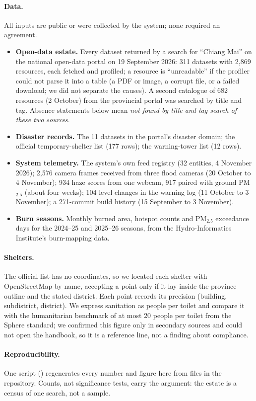 \documentclass[10pt,twocolumn,a4paper]{article}
\newcommand{\kw}[1]{\textbf{#1}}
\begin{document}
\paragraph{Data.} All inputs are public or were collected by the system; none required an agreement.
\begin{itemize}
\item \kw{Open-data estate.} Every dataset returned by a search for ``Chiang Mai'' on the national open-data portal on 19 September 2026: 311 datasets with 2{,}869 resources, each fetched and profiled; a resource is ``unreadable'' if the profiler could not parse it into a table (a PDF or image, a corrupt file, or a failed download; we did not separate the causes). A second catalogue of 682 resources (2 October) from the provincial portal was searched by title and tag. Absence statements below mean \emph{not found by title and tag search of these two sources}.
\item \kw{Disaster records.} The 11 datasets in the portal's disaster domain; the official temporary-shelter list (177 rows); the warning-tower list (12 rows).
\item \kw{System telemetry.} The system's own feed registry (32 entities, 4 November 2026); 2,576 camera frames received from three flood cameras (20 October to 4 November); 934 haze scores from one webcam, 917 paired with ground PM$_{2.5}$ (about four weeks); 104 level changes in the warning log (11 October to 3 November); a 271-commit build history (15 September to 3 November).
\item \kw{Burn seasons.} Monthly burned area, hotspot counts and PM$_{2.5}$ exceedance days for the 2024--25 and 2025--26 seasons, from the Hydro-Informatics Institute's burn-mapping data.
\end{itemize}
\paragraph{Shelters.} The official list has no coordinates, so we located each shelter with OpenStreetMap by name, accepting a point only if it lay inside the province outline and the stated district. Each point records its precision (building, subdistrict, district). We express sanitation as people per toilet and compare it with the humanitarian benchmark of at most 20 people per toilet from the Sphere standard; we confirmed this figure only in secondary sources and could not open the handbook, so it is a reference line, not a finding about compliance.
\paragraph{Reproducibility.} One script () regenerates every number and figure here from files in the repository. Counts, not significance tests, carry the argument: the estate is a census of one search, not a sample.
\end{document}
